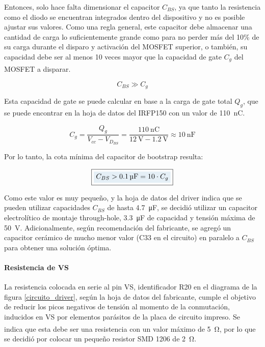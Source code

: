 Entonces, solo hace falta dimensionar el capacitor $C_{BS}$, ya que tanto la resistencia como el diodo se encuentran integrados dentro del dispositivo y no es posible ajustar sus valores. Como una regla general, este capacitor debe almacenar una cantidad de carga lo suficientemente grande como para no perder más del 10\% de su carga durante el disparo y activación del MOSFET superior, o también, su capacidad debe ser al menos 10 veces mayor que la capacidad de gate $C_g$ del MOSFET a disparar.\textsuperscript{\cite{Bootstrap}}

\begin{equation*}
    C_{BS} \gg C_g
\end{equation*}

Esta capacidad de gate se puede calcular en base a la carga de gate total $Q_g$, que se puede encontrar en la hoja de datos del IRFP150 con un valor de \SI[]{110}{\nano\coulomb}.

\begin{equation}\label{capacidad_gate}
    C_g = \frac{Q_g}{V_{cc}-V_{D_{BS}}} = \frac{\SI[]{110}{\nano\coulomb}}{\SI[]{12}{\volt}-\SI[]{1.2}{\volt}} \approx \SI[]{10}{\nano\farad}
\end{equation}

Por lo tanto, la cota mínima del capacitor de bootstrap resulta:

\begin{equation}\label{capacidad_bs_min}
    \boxed{\highlight{
    C_{BS} > \SI[]{0.1}{\micro\farad} = 10\cdot C_g}}
\end{equation}

Como este valor es muy pequeño, y la hoja de datos del driver indica que se pueden utilizar capacidades $C_{BS}$ de hasta \SI[]{4.7}{\micro\farad}, se decidió utilizar un capacitor electrolítico de montaje through-hole, \SI[]{3.3}{\micro\farad} de capacidad y tensión máxima de \SI[]{50}{\volt}. Adicionalmente, según recomendación del fabricante, se agregó un capacitor cerámico de mucho menor valor (C33 en el circuito) en paralelo a $C_{BS}$ para obtener una solución óptima.\\

\paragraph{Resistencia de VS}

La resistencia colocada en serie al pin VS, identificador R20 en el diagrama de la figura \ref{circuito_driver}, según la hoja de datos del fabricante, cumple el objetivo de reducir los picos negativos de tensión al momento de la conmutación, inducidos en VS por elementos parásitos de la placa de circuito impreso. Se indica que esta debe ser una resistencia con un valor máximo de \SI[]{5}{\ohm}\textsuperscript{\cite{DatasheetDriver}}, por lo que se decidió por colocar un pequeño resistor SMD 1206 de \SI[]{2}{\ohm}.\\
